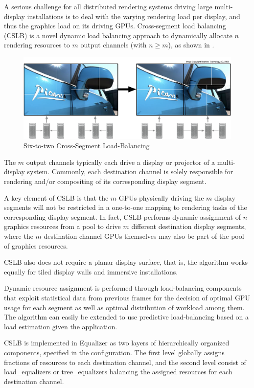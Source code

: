 A serious challenge for all distributed rendering systems driving large
multi-display installations is to deal with the varying rendering load per
display, and thus the graphics load on its driving GPUs. Cross-segment load
balancing (CSLB) is a novel dynamic load balancing approach to dynamically
allocate $n$ rendering resources to $m$ output channels (with $n\geq m$), as
shown in .

\begin{figure}[h!t]
  \includegraphics[width=\textwidth]{images/vieweq}
  \caption{\label{fvieweq}Six-to-two Cross-Segment Load-Balancing}
\end{figure}

The $m$ output channels typically each drive a display or projector of a
multi-display system. Commonly, each destination channel is solely responsible
for rendering and/or compositing of its corresponding display segment.

A key element of CSLB is that the $m$ GPUs physically driving the $m$ display
segments will not be restricted in a one-to-one mapping to rendering tasks of
the corresponding display segment. In fact, CSLB performs dynamic assignment of
$n$ graphics resources from a pool to drive $m$ different destination display
segments, where the $m$ destination channel GPUs themselves may also be part of
the pool of graphics resources.

CSLB also does not require a planar display surface, that is, the algorithm
works equally for tiled display walls and immersive installations.

Dynamic resource assignment is performed through load-balancing components that
exploit statistical data from previous frames for the decision of optimal GPU
usage for each segment as well as optimal distribution of workload among them.
The algorithm can easily be extended to use predictive load-balancing based on
a load estimation given the application.

CSLB is implemented in Equalizer as two layers of hierarchically organized
components, specified in the configuration. The first level globally assigns
fractions of resources to each destination channel, and the second level
consist of load\_equalizers or tree\_equalizers balancing the assigned
resources for each destination channel.

